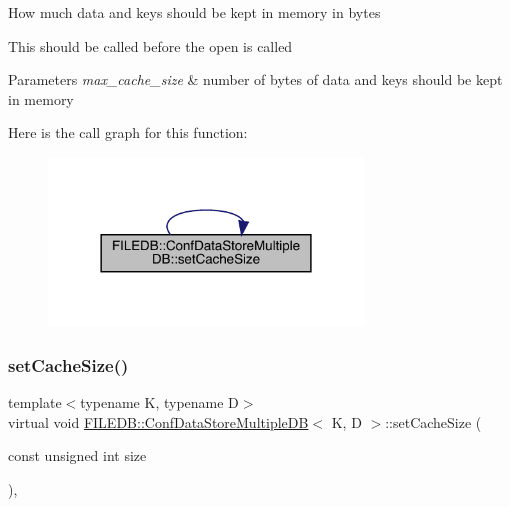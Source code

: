 How much data and keys should be kept in memory in bytes

This should be called before the open is called 
\begin{DoxyParams}{Parameters}
{\em max\+\_\+cache\+\_\+size} & number of bytes of data and keys should be kept in memory \\
\hline
\end{DoxyParams}
Here is the call graph for this function\+:
\nopagebreak
\begin{figure}[H]
\begin{center}
\leavevmode
\includegraphics[width=237pt]{d3/dc0/classFILEDB_1_1ConfDataStoreMultipleDB_a37115269cf1f8f04c49ab888b040fa13_cgraph}
\end{center}
\end{figure}
\mbox{\label{classFILEDB_1_1ConfDataStoreMultipleDB_a37115269cf1f8f04c49ab888b040fa13}} 
\subsubsection{\texorpdfstring{setCacheSize()}{setCacheSize()}\hspace{0.1cm}{\footnotesize\ttfamily [3/3]}}
{\footnotesize\ttfamily template$<$typename K, typename D$>$ \\
virtual void \mbox{\hyperlink{classFILEDB_1_1ConfDataStoreMultipleDB}{F\+I\+L\+E\+D\+B\+::\+Conf\+Data\+Store\+Multiple\+DB}}$<$ K, D $>$\+::set\+Cache\+Size (\begin{DoxyParamCaption}\item[{const unsigned int}]{size }\end{DoxyParamCaption})\hspace{0.3cm}{\ttfamily [inline]}, {\ttfamily [virtual]}}

